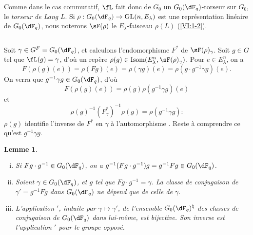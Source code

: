 \documentclass[oneside]{book}
\DeclareMathOperator{\gl}{GL}
\theoremstyle{sga-source}
\theoremstyle{sga-source-dash}
\theoremstyle{sga-source-dotdash}
\theoremstyle{sga-source-number-note-dash}
\theoremstyle{sga-source-note-number-dotdash}
\theoremstyle{sga-source-example-dotdash}
\theoremstyle{sga-source-inline-number}
\theoremstyle{sga-source-bare-number}
\theoremstyle{sga-source}
\newtheorem{lemma_}[subsection]{Lemme}
\begin{document}
Comme dans le cas commutatif, $\fL$ fait donc de $G_0$ un $G_0(\dF_q)$-torseur 
sur $G_0$, le \emph{torseur de Lang} $L$. Si 
$\rho:G_0(\dF_q) \to \gl(n,E_\lambda)$ est une représentation linéaire de 
$G_0(\dF_q)$, nous noterons $\sF(\rho)$ le $E_\lambda$-faisceau $\rho(L)$ 
(\ref{VI:1-2}). 





\subsection{}\label{VI:1-23}

Soit $\gamma\in G^F=G_0(\dF_q)$, et calculons l'endomorphisme $F^\ast$ de 
$\sF(\rho)_\gamma$. Soit $g\in G$ tel que $\fL(g)=\gamma$, d'où un repère 
$\rho(g)\in \operatorname{Isom}(E_\lambda^n,\sF(\rho)_\gamma)$. Pour 
$e\in E_\lambda^n$, on a 
\[
  F(\rho(g)(e)) = \rho(F g)(e) = \rho(\gamma g)(e) = \rho(g\cdot g^{-1}\gamma g)(e) \text{.}
\]
On verra que $g^{-1} \gamma g\in G_0(\dF_q)$, d'où 
\[
  F(\rho(g)(e)) = \rho(g) \rho(g^{-1}\gamma g)(e)
\]
et 
\begin{equation*}\tag{1.23.1}\label{VI:eq:1-23-1}
  \rho(g)^{-1} (F_\gamma^\ast)^{-1} \rho(g) = \rho(g^{-1} \gamma g) \text{:}
\end{equation*}
$\rho(g)$ identifie l'inverse de $F^\ast$ en $\gamma$ à l'automorphisme 
. Reste à comprendre ce qu'est 
$g^{-1} \gamma g$. 





\begin{lemma_}\label{VI:1-24}
\begin{enumerate}[(i)]
  \item Si $F g\cdot g^{-1} \in G_0(\dF_q)$, on a 
    $g^{-1} (F g\cdot g^{-1}) g = g^{-1} F g\in G_0(\dF_q)$.
  \item Soient $\gamma\in G_0(\dF_q)$, et $g$ tel que 
    $F g\cdot g^{-1} = \gamma$. La classe de conjugaison de $\gamma'=g^{-1} Fg$ 
    dans $G_0(\dF_q)$ ne dépend que de celle de $\gamma$. 
  \item L'application $\prime$, induite par $\gamma\mapsto \gamma'$, de l'ensemble 
    $G_0(\dF_q)^\natural$ des classes de conjugaison de $G_0(\dF_q)$ dans 
    lui-même, est bijective. Son inverse est l'application $\prime$ pour le groupe 
    opposé. 
\end{enumerate}
\end{lemma_}
\end{document}

